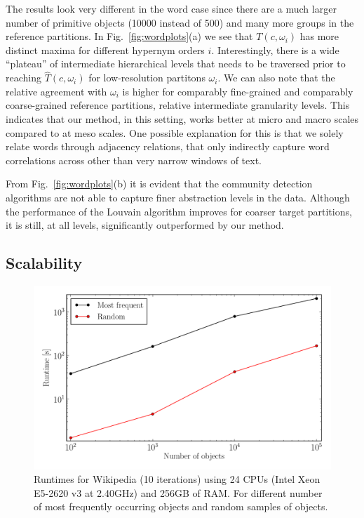 \documentclass[conference]{IEEEtran}
\newcommand{\fig}[1]{Fig.\ \ref{#1}}
\newcommand{\inquotes}[1]{``#1''}
\begin{document}
The results look very different in the word case since there are a much larger number of primitive objects (10000 instead of 500)
and many more groups in the reference partitions. In \fig{fig:wordplots}(a) we see that $T(c, \omega_i)$ has more distinct 
maxima for different hypernym orders $i$. Interestingly, there is a wide \inquotes{plateau} of intermediate 
hierarchical levels that needs to be traversed prior to reaching $\hat{T}(c, \omega_i)$ for low-resolution
partitons $\omega_i$. We can also note that the relative agreement with $\omega_i$ is higher for comparably
fine-grained and comparably coarse-grained reference partitions, relative intermediate granularity levels. 
This indicates that our method, in this setting, works better at micro and macro scales compared to at meso scales. 
One possible explanation for this is that we solely relate words through adjacency relations, that only indirectly
capture word correlations across other than very narrow windows of text.

From \fig{fig:wordplots}(b) it is evident that the community detection algorithms are not able to capture finer 
abstraction levels in the data. Although the performance of the Louvain algorithm improves for coarser target partitions, 
it is still, at all levels, significantly outperformed by our method.

\subsection{Scalability}
\label{sec: scalability}

\begin{figure}
\begin{center}
\includegraphics[width=0.9\columnwidth]{figures/wiki-runtime.pdf}
\end{center}
\caption{Runtimes for Wikipedia (10 iterations) using 24 CPUs (Intel Xeon E5-2620 v3 at 2.40GHz) and 256GB of RAM.
For different number of most frequently occurring objects and random samples of objects.}
\label{fig:runtime}
\end{figure}
\end{document}
